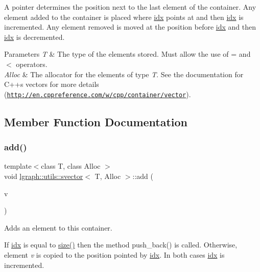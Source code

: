 A pointer determines the position next to the last element of the container. Any element added to the container is placed where \hyperlink{classlgraph_1_1utils_1_1svector_a7ef963c079c7dc8a6a559ceef81a241f}{idx} points at and then \hyperlink{classlgraph_1_1utils_1_1svector_a7ef963c079c7dc8a6a559ceef81a241f}{idx} is incremented. Any element removed is moved at the position before \hyperlink{classlgraph_1_1utils_1_1svector_a7ef963c079c7dc8a6a559ceef81a241f}{idx} and then \hyperlink{classlgraph_1_1utils_1_1svector_a7ef963c079c7dc8a6a559ceef81a241f}{idx} is decremented.


\begin{DoxyParams}{Parameters}
{\em T} & The type of the elements stored. Must allow the use of \textquotesingle{}=\textquotesingle{} and \textquotesingle{}$<$\textquotesingle{} operators.\\
\hline
{\em Alloc} & The allocator for the elements of type {\itshape T}. See the documentation for C++\textquotesingle{}s vectors for more details (\href{http://en.cppreference.com/w/cpp/container/vector}{\tt http\+://en.\+cppreference.\+com/w/cpp/container/vector}). \\
\hline
\end{DoxyParams}


\subsection{Member Function Documentation}
\mbox{\label{classlgraph_1_1utils_1_1svector_a14ffd05a33eeae26ddb0909d8f64ad28}} 
\subsubsection{\texorpdfstring{add()}{add()}}
{\footnotesize\ttfamily template$<$class T, class Alloc $>$ \\
void \hyperlink{classlgraph_1_1utils_1_1svector}{lgraph\+::utils\+::svector}$<$ T, Alloc $>$\+::add (\begin{DoxyParamCaption}\item[{const T \&}]{v }\end{DoxyParamCaption})}



Adds an element to this container. 

If \hyperlink{classlgraph_1_1utils_1_1svector_a7ef963c079c7dc8a6a559ceef81a241f}{idx} is equal to \hyperlink{classlgraph_1_1utils_1_1svector_af099aed6d134ad4c934be1339e4cf98c}{size()} then the method push\+\_\+back() is called. Otherwise, element {\itshape v} is copied to the position pointed by \hyperlink{classlgraph_1_1utils_1_1svector_a7ef963c079c7dc8a6a559ceef81a241f}{idx}. In both cases \hyperlink{classlgraph_1_1utils_1_1svector_a7ef963c079c7dc8a6a559ceef81a241f}{idx} is incremented.


